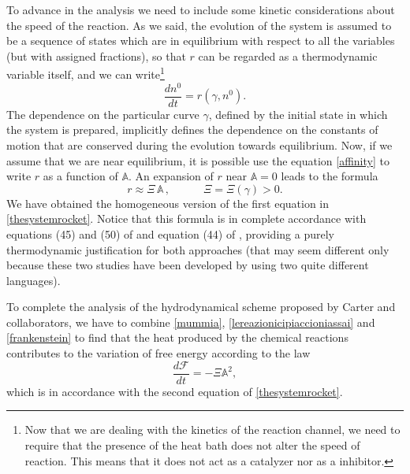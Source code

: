 \documentclass[usenatbib]{mnras}
\newcommand{\spc}{\quad \quad \quad}
\begin{document}
To advance in the analysis we need to include some kinetic considerations about the speed of the reaction. 
As we said, the evolution of the system is assumed to be a sequence of states which are in equilibrium with respect to all the variables (but with assigned fractions), so that $r$ can be regarded as a thermodynamic variable itself, and we can write\footnote{
Now that  we are dealing with the kinetics of the reaction channel, we need to require that the presence of the heat bath does not alter the speed of reaction. This means that it does not act as a catalyzer nor as a  inhibitor.
}
%
\begin{equation}\label{lereazionicipiaccioniassai}
\dfrac{dn^0}{dt} = r(\gamma,n^0).
\end{equation}  
%
The dependence on the particular curve $\gamma$, defined by the initial state in which the system is prepared, implicitly defines the dependence on the constants of motion that are conserved during the evolution towards equilibrium. Now, if we assume that we are near equilibrium, it is possible use the equation \eqref{affinity} to write $r$ as a function of $\mathbb{A}$. An expansion of $r$ near $\mathbb{A}=0$ leads to  the formula
%
\begin{equation}\label{frankenstein}
r \approx  \Xi \, \mathbb{A} \, ,  \spc  \Xi = \Xi(\gamma) >0.
\end{equation}
%
We have obtained the homogeneous version of the first equation in \eqref{thesystemrocket}. Notice that this formula 
is in complete accordance with equations (45) and (50) of \cite{Gusakov2007} and equation (44) of \cite{langlois98},   
providing a purely thermodynamic justification for both approaches (that may seem different only because these two  studies have been developed by using two quite different languages).

To complete the analysis of the hydrodynamical scheme  proposed by Carter and collaborators, we have to combine \eqref{mummia}, \eqref{lereazionicipiaccioniassai} and \eqref{frankenstein} to find that the  heat produced by the chemical reactions contributes to the variation of free energy according to the law 
%
\begin{equation}
\dfrac{d \mathcal{F}}{dt} = -\Xi \mathbb{A}^2,
\end{equation}
%
which is in accordance with the second equation of \eqref{thesystemrocket}. 
\end{document}

